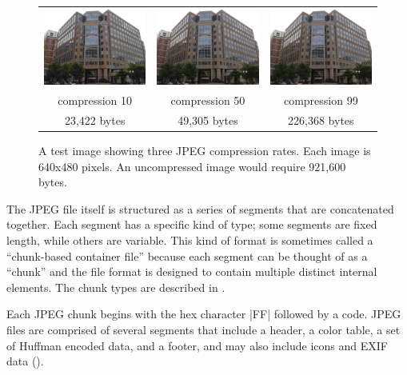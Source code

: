 \begin{figure}
\begin{tabular}{ccc}
\includegraphics[width=2in]{ch-jpeg/nsf_hq_640x480-q10.jpg} & 
\includegraphics[width=2in]{ch-jpeg/nsf_hq_640x480-q50.jpg} &
\includegraphics[width=2in]{ch-jpeg/nsf_hq_640x480-q99.jpg} \\
compression 10 & compression 50 & compression 99 \\
23,422 bytes & 49,305 bytes & 226,368 bytes \\
\end{tabular}
\caption{A test image showing three JPEG compression rates. Each image
  is 640x480 pixels. An uncompressed image would require 921,600 bytes.}
\end{figure}

The JPEG file itself is structured as a series of segments that are
concatenated together. Each segment has a specific kind of type; some
segments are fixed length, while others are variable. This kind of
format is sometimes called a ``chunk-based container file'' because
each segment can be thought of as a ``chunk'' and the file format is
designed to contain multiple distinct internal elements. The chunk
types are described in .

Each JPEG chunk begins with the hex character |FF| followed by a code.
JPEG files are comprised of several segments that include a header, a
color table, a set of Huffman encoded data, and a footer, and may also
include icons and EXIF data (). 

